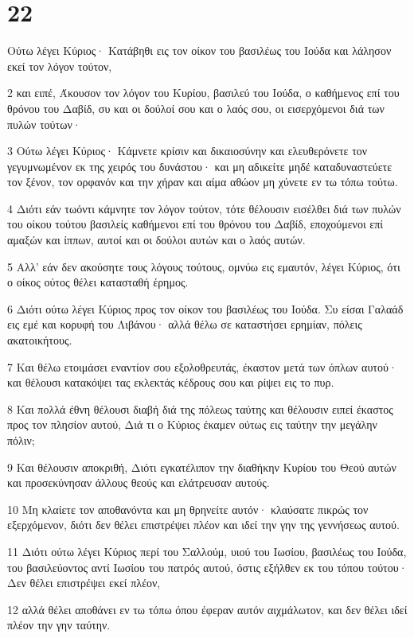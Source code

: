 \chapter{22}

\par Ούτω λέγει Κύριος· Κατάβηθι εις τον οίκον του βασιλέως του Ιούδα και λάλησον εκεί τον λόγον τούτον,
\par 2 και ειπέ, Άκουσον τον λόγον του Κυρίου, βασιλεύ του Ιούδα, ο καθήμενος επί του θρόνου του Δαβίδ, συ και οι δούλοί σου και ο λαός σου, οι εισερχόμενοι διά των πυλών τούτων·
\par 3 Ούτω λέγει Κύριος· Κάμνετε κρίσιν και δικαιοσύνην και ελευθερόνετε τον γεγυμνωμένον εκ της χειρός του δυνάστου· και μη αδικείτε μηδέ καταδυναστεύετε τον ξένον, τον ορφανόν και την χήραν και αίμα αθώον μη χύνετε εν τω τόπω τούτω.
\par 4 Διότι εάν τωόντι κάμνητε τον λόγον τούτον, τότε θέλουσιν εισέλθει διά των πυλών του οίκου τούτου βασιλείς καθήμενοι επί του θρόνου του Δαβίδ, εποχούμενοι επί αμαξών και ίππων, αυτοί και οι δούλοι αυτών και ο λαός αυτών.
\par 5 Αλλ' εάν δεν ακούσητε τους λόγους τούτους, ομνύω εις εμαυτόν, λέγει Κύριος, ότι ο οίκος ούτος θέλει κατασταθή έρημος.
\par 6 Διότι ούτω λέγει Κύριος προς τον οίκον του βασιλέως του Ιούδα. Συ είσαι Γαλαάδ εις εμέ και κορυφή του Λιβάνου· αλλά θέλω σε καταστήσει ερημίαν, πόλεις ακατοικήτους.
\par 7 Και θέλω ετοιμάσει εναντίον σου εξολοθρευτάς, έκαστον μετά των όπλων αυτού· και θέλουσι κατακόψει τας εκλεκτάς κέδρους σου και ρίψει εις το πυρ.
\par 8 Και πολλά έθνη θέλουσι διαβή διά της πόλεως ταύτης και θέλουσιν ειπεί έκαστος προς τον πλησίον αυτού, Διά τι ο Κύριος έκαμεν ούτως εις ταύτην την μεγάλην πόλιν;
\par 9 Και θέλουσιν αποκριθή, Διότι εγκατέλιπον την διαθήκην Κυρίου του Θεού αυτών και προσεκύνησαν άλλους θεούς και ελάτρευσαν αυτούς.
\par 10 Μη κλαίετε τον αποθανόντα και μη θρηνείτε αυτόν· κλαύσατε πικρώς τον εξερχόμενον, διότι δεν θέλει επιστρέψει πλέον και ιδεί την γην της γεννήσεως αυτού.
\par 11 Διότι ούτω λέγει Κύριος περί του Σαλλούμ, υιού του Ιωσίου, βασιλέως του Ιούδα, του βασιλεύοντος αντί Ιωσίου του πατρός αυτού, όστις εξήλθεν εκ του τόπου τούτου· Δεν θέλει επιστρέψει εκεί πλέον,
\par 12 αλλά θέλει αποθάνει εν τω τόπω όπου έφεραν αυτόν αιχμάλωτον, και δεν θέλει ιδεί πλέον την γην ταύτην.

